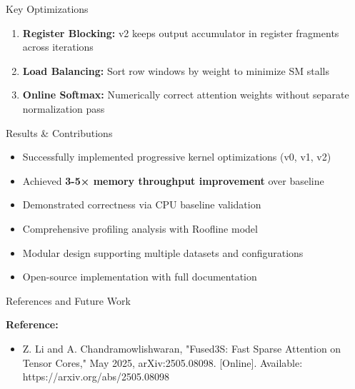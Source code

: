 \documentclass[final]{beamer}
\newlength{\colwidth}
\begin{document}
\begin{frame}[t]
\begin{columns}[t]
\begin{column}{\colwidth}
\begin{block}{Key Optimizations}
\begin{enumerate}
      \item \textbf{Register Blocking:} v2 keeps output accumulator in register fragments across iterations
      
      \item \textbf{Load Balancing:} Sort row windows by weight to minimize SM stalls
      
      \item \textbf{Online Softmax:} Numerically correct attention weights without separate normalization pass
    \end{enumerate}

  \end{block}

  \begin{block}{Results \& Contributions}

    \begin{itemize}
      \item[$\checkmark$] Successfully implemented progressive kernel optimizations (v0, v1, v2)
      
      \item[$\checkmark$] Achieved \textbf{3-5× memory throughput improvement} over baseline
      
      \item[$\checkmark$] Demonstrated correctness via CPU baseline validation
      
      \item[$\checkmark$] Comprehensive profiling analysis with Roofline model
      
      \item[$\checkmark$] Modular design supporting multiple datasets and configurations
      
      \item[$\checkmark$] Open-source implementation with full documentation
    \end{itemize}

  \end{block}

  \begin{block}{References and Future Work}

    \textbf{Reference:}
    \begin{itemize}
      \item Z. Li and A. Chandramowlishwaran, "Fused3S: Fast Sparse Attention on Tensor Cores," May 2025, arXiv:2505.08098. [Online]. Available: https://arxiv.org/abs/2505.08098
    \end{itemize}


\end{block}
\end{column}
\end{columns}
\end{frame}
\end{document}
